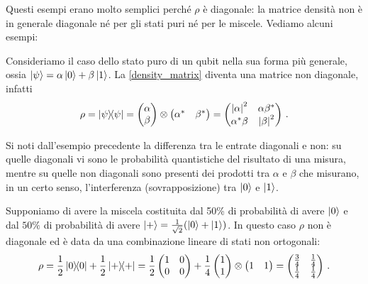 \noindent Questi esempi erano molto semplici perché $\rho$ è diagonale: la matrice densità non è in generale diagonale né per gli stati puri né per le miscele. Vediamo alcuni esempi:

\begin{esempio}\label{example:rho_non_diagonal_pure}
    Consideriamo il caso dello stato puro di un qubit nella sua forma più generale, ossia $\ket{\psi} = \alpha \ket{0} + \beta \ket{1}$. La \eqref{density_matrix} diventa una matrice non diagonale, infatti
    \begin{equation*}
        \rho = \ketbra{\psi} = 
        \begin{pmatrix}
            \alpha \\ \beta
        \end{pmatrix}
        \otimes
        \begin{pmatrix}
            \alpha^\ast & \beta^\ast
        \end{pmatrix} 
        = 
        \begin{pmatrix}
            \abs{\alpha}^2 & \alpha \beta^\ast \\ \alpha^\ast \beta & \abs{\beta}^2
        \end{pmatrix} \, .
    \end{equation*}
\end{esempio}

\noindent Si noti dall'esempio precedente la differenza tra le entrate diagonali e non: su quelle diagonali vi sono le probabilità quantistiche del risultato di una misura, mentre su quelle non diagonali sono presenti dei prodotti tra $\alpha$ e $\beta$ che misurano, in un certo senso, l'interferenza (sovrapposizione) tra $\ket{0}$ e $\ket{1}$.

\begin{esempio}\label{example:rho_non_diagonal_mixture}
    Supponiamo di avere la miscela costituita dal 50\% di probabilità di avere $\ket{0}$ e dal $50\%$ di probabilità di avere $\ket{+} = \frac{1}{\sqrt{2}} (\ket{0} + \ket{1})$. In questo caso $\rho$ non è diagonale ed è data da una combinazione lineare di stati non ortogonali:
    \begin{equation*}
        \rho = \frac{1}{2} \ketbra{0} + \frac{1}{2} \ketbra{+} = \frac{1}{2} \begin{pmatrix} 1 & 0 \\ 0 & 0 \end{pmatrix} + \frac{1}{4} \begin{pmatrix} 1 \\ 1 \end{pmatrix} \otimes \begin{pmatrix} 1 & 1 \end{pmatrix} = \begin{pmatrix} \frac{3}{4} & \frac{1}{4} \\ \frac{1}{4} & \frac{1}{4} \end{pmatrix} \, . 
    \end{equation*}
\end{esempio}

